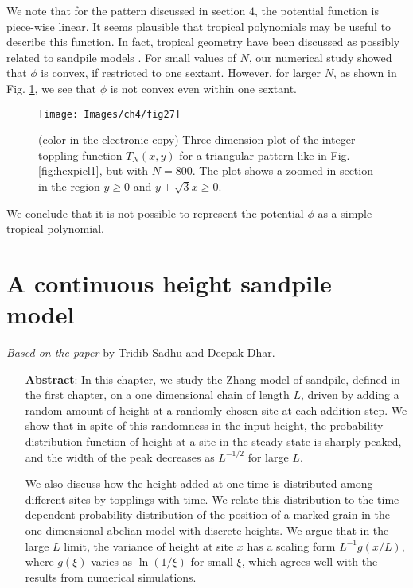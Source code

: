 \documentclass[11pt,a4paper]{book}
\begin{document}
We note that for the pattern discussed in section $4$, the potential
function is piece-wise linear. It seems plausible that  tropical polynomials may be useful
to describe this function. In fact, tropical geometry have been
discussed as possibly related to sandpile models \cite{norine,propp2}.
For small values of $N$, our numerical study showed that  $\phi$
is convex, if restricted to one sextant. However, for larger $N$, as
shown in Fig. \ref{surfaceplot}, we see that $\phi$ is not convex even
within one sextant.
%
\begin{figure}[t]
\begin{center}
\texttt{[image: Images/ch4/fig27]}
\caption{(color in the electronic copy) Three dimension plot of the integer toppling function
$T_{N}\left( x,y \right)$ for a triangular pattern like in Fig.
\ref{fig:hexpicl1}, but with $N=800$. The plot shows a zoomed-in
section in the region $y\ge0$ and $y+\sqrt{3}x\ge0$.}
\label{surfaceplot}
\end{center}
\end{figure}
%
We conclude that it is not possible to
represent the potential $\phi$ as a simple tropical polynomial.
\chapter{A continuous height sandpile model}\label{ch:zhang}
\textit{Based on the paper \cite{mypre}} by Tridib Sadhu and Deepak
Dhar.

\begin{itemize}
\item[\textbf{Abstract}:]
In this chapter, we study the Zhang model of sandpile, defined in the first
chapter, on a one dimensional chain of length $L$, driven by adding a random amount of height
at a randomly chosen site at each addition step. We show that in spite
of this randomness in the input height, the probability distribution 
function of height at a site in the steady state is sharply peaked, and 
the width of the peak decreases as $ {L}^{-1/2}$ for large $L$.

We also
discuss how the height added at one time is distributed among 
different sites by topplings with time. We relate this distribution to 
the time-dependent probability distribution of the position of a 
marked grain in the 
one dimensional abelian model with discrete heights.  We argue that in 
the large $L$ limit, the variance of height at site $x$ has a scaling 
form $L^{-1}g(x/L)$, where $g(\xi)$ varies as $\ln(1/\xi)$ for 
small $\xi$, which agrees well with the results from 
numerical simulations. 
\end{itemize}
\end{document}
